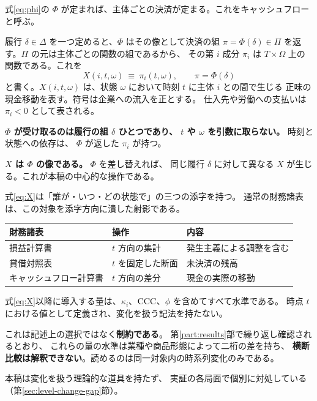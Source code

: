式\eqref{eq:phi}の $\Phi$ が定まれば、主体ごとの決済が定まる。これをキャッシュフローと呼ぶ。

\begin{definition}[キャッシュフロー]
履行 $\delta\in\Delta$ を一つ定めると、$\Phi$ はその像として決済の組
$\pi = \Phi(\delta) \in \Pi$ を返す。$\Pi$ の元は主体ごとの関数の組であるから、
その第 $i$ 成分 $\pi_i$ は $T\times\Omega$ 上の関数である。これを
\begin{equation}
X(i,t,\omega) \ \equiv\ \pi_i(t,\omega), \qquad \pi = \Phi(\delta)
\label{eq:X}
\end{equation}
と書く。$X(i,t,\omega)$ は、状態 $\omega$ において時刻 $t$ に主体 $i$ との間で生じる
正味の現金移動を表す。符号は企業への流入を正とする。
仕入先や労働への支払いは $\pi_i<0$ として表される。
\end{definition}

\textbf{$\Phi$ が受け取るのは履行の組 $\delta$ ひとつであり、
$t$ や $\omega$ を引数に取らない。} 時刻と状態への依存は、
$\Phi$ が返した $\pi_i$ が持つ。

\textbf{$X$ は $\Phi$ の像である。} $\Phi$ を差し替えれば、
同じ履行 $\delta$ に対して異なる $X$ が生じる。これが本稿の中心的な操作である。

式\eqref{eq:X}は「誰が・いつ・どの状態で」の三つの添字を持つ。
通常の財務諸表は、この対象を添字方向に潰した射影である。

\begin{center}
\begin{tabularx}{\textwidth}{@{}llX@{}}
\toprule
財務諸表 & 操作 & 内容 \\
\midrule
損益計算書 & $t$ 方向の集計 & 発生主義による調整を含む \\
貸借対照表 & $t$ を固定した断面 & 未決済の残高 \\
キャッシュフロー計算書 & $t$ 方向の差分 & 現金の実際の移動 \\
\bottomrule
\end{tabularx}
\label{tab:statements-projection}
\end{center}

\begin{remark}[本稿の量はすべて水準である]
\label{rem:level-vs-change}
式\eqref{eq:X}以降に導入する量は、$\kappa_i$、$\mathrm{CCC}$、$\phi$ を含めてすべて水準である。
時点 $t$ における値として定義され、変化を扱う記法を持たない。

これは記述上の選択ではなく\textbf{制約である}。
第\ref{part:results}部で繰り返し確認されるとおり、
これらの量の水準は業種や商品形態によって二桁の差を持ち、
\textbf{横断比較は解釈できない}。読めるのは同一対象内の時系列変化のみである。

本稿は変化を扱う理論的な道具を持たず、
実証の各局面で個別に対処している（第\ref{sec:level-change-gap}節）。
\end{remark}

